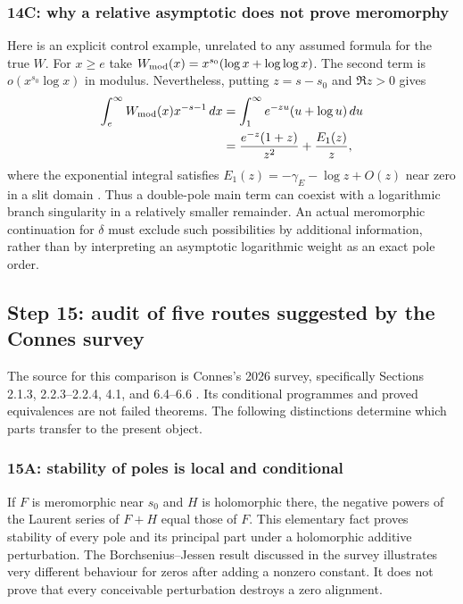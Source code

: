 \subsubsection{14C: why a relative asymptotic does not prove meromorphy}
\label{subsubsec:a12-branch-model}
Here is an explicit control example, unrelated to any assumed formula
for the true $W$. For $x\ge e$ take
$W_{\rm mod}(x)=x^{s_0}(\log x+\log\log x)$.
The second term is $o(x^{s_0}\log x)$ in modulus. Nevertheless, putting
$z=s-s_0$ and $\Re z>0$ gives
\begin{align}
\int_e^\infty W_{\rm mod}(x)x^{-s-1}\,dx
&=\int_1^\infty e^{-zu}(u+\log u)\,du\notag\\
&=\frac{e^{-z}(1+z)}{z^2}+\frac{E_1(z)}z,
\label{eq:a12-branch-example}
\end{align}
where the exponential integral satisfies
$E_1(z)=-\gamma_{\!E}-\log z+O(z)$ near zero in a slit domain
\cite{DLMF}. Thus a double-pole main term can coexist with a logarithmic
branch singularity in a relatively smaller remainder.
An actual meromorphic continuation for $\delta$ must exclude such
possibilities by additional information, rather than by interpreting
an asymptotic logarithmic weight as an exact pole order.

\subsection{Step 15: audit of five routes suggested by the Connes survey}
\label{subsec:a12-Connes-survey}
The source for this comparison is Connes's 2026 survey, specifically
Sections 2.1.3, 2.2.3--2.2.4, 4.1, and 6.4--6.6
\cite{Connes2026}. Its conditional programmes and proved equivalences
are not failed theorems. The following distinctions determine which
parts transfer to the present object.

\subsubsection{15A: stability of poles is local and conditional}
\label{subsubsec:a12-pole-stability}
If $F$ is meromorphic near $s_0$ and $H$ is holomorphic there, the negative
powers of the Laurent series of $F+H$ equal those of $F$.
This elementary fact proves stability of every pole and its principal
part under a holomorphic additive perturbation.
The Borchsenius--Jessen result discussed in the survey illustrates very
different behaviour for zeros after adding a nonzero constant.
It does not prove that every conceivable perturbation destroys a zero
alignment.

